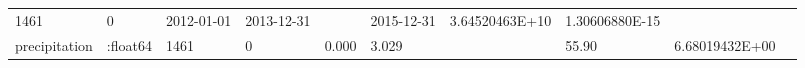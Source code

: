 \documentclass[]{article}
\begin{document}
\begin{longtable}[]{@{}llllllllll@{}}
\begin{minipage}[t]{0.05\columnwidth}
1461\strut
\end{minipage} & \begin{minipage}[t]{0.06\columnwidth}\raggedright
0\strut
\end{minipage} & \begin{minipage}[t]{0.06\columnwidth}\raggedright
2012-01-01\strut
\end{minipage} & \begin{minipage}[t]{0.06\columnwidth}\raggedright
2013-12-31\strut
\end{minipage} & \begin{minipage}[t]{0.04\columnwidth}\raggedright
\strut
\end{minipage} & \begin{minipage}[t]{0.06\columnwidth}\raggedright
2015-12-31\strut
\end{minipage} & \begin{minipage}[t]{0.11\columnwidth}\raggedright
3.64520463E+10\strut
\end{minipage} & \begin{minipage}[t]{0.09\columnwidth}\raggedright
1.30606880E-15\strut
\end{minipage}\tabularnewline
\begin{minipage}[t]{0.08\columnwidth}\raggedright
precipitation\strut
\end{minipage} & \begin{minipage}[t]{0.11\columnwidth}\raggedright
:float64\strut
\end{minipage} & \begin{minipage}[t]{0.05\columnwidth}\raggedright
1461\strut
\end{minipage} & \begin{minipage}[t]{0.06\columnwidth}\raggedright
0\strut
\end{minipage} & \begin{minipage}[t]{0.06\columnwidth}\raggedright
0.000\strut
\end{minipage} & \begin{minipage}[t]{0.06\columnwidth}\raggedright
3.029\strut
\end{minipage} & \begin{minipage}[t]{0.04\columnwidth}\raggedright
\strut
\end{minipage} & \begin{minipage}[t]{0.06\columnwidth}\raggedright
55.90\strut
\end{minipage} & \begin{minipage}[t]{0.11\columnwidth}\raggedright
6.68019432E+00\strut

\end{minipage}
\end{longtable}
\end{document}
